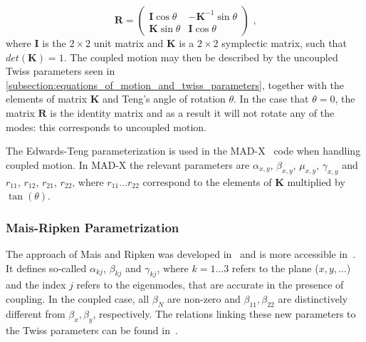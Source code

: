 \begin{equation}
    \mathbf{R} =\left(
        \begin{array}{cc}
            \mathbf{I} \cos \theta & -\mathbf{K}^{-1} \sin \theta \\
            \mathbf{K} \sin \theta & \mathbf{I} \cos \theta
    \end{array} \right) \text{ ,}
    \label{equation:edwards_teng_rotation_matrix}
\end{equation}
where \(\mathbf{I}\) is the \(2 \times 2\) unit matrix and \(\mathbf{K}\) is a \(2 \times 2\) symplectic matrix, such that \(det(\mathbf{K}) = 1\).
The coupled motion may then be described by the uncoupled Twiss parameters seen in \cref{subsection:equations_of_motion_and_twiss_parameters}, together with the elements of matrix \(\mathbf{K}\) and Teng's angle of rotation \(\theta\).
In the case that \(\theta = 0\), the matrix \(\mathbf{R}\) is the identity matrix and as a result it will not rotate any of the modes: this corresponds to uncoupled motion.

The Edwards-Teng parameterization is used in the MAD-X~\cite{CODE:MADX_guide} code when handling coupled motion.
In MAD-X the relevant parameters are \(\alpha_{x, y}\), \(\beta_{x, y}\), \(\mu_{x, y}\), \(\gamma_{x, y}\) and \(r_{11}\), \(r_{12}\), \(r_{21}\), \(r_{22}\), where \(r_{11} \ldots r_{22}\) correspond to the elements of \(\mathbf{K}\) multiplied by \(\tan(\theta)\).

\subsubsection*{Mais-Ripken Parametrization}

The approach of Mais and Ripken was developed in~\cite{REPORT:Ripken:AllGerman} and is more accessible in~\cite{AIP:Willeke:Methods_Beam_Optics, REPORT:Borchardt:Calculation_Beam_Envelopes}.
It defines so-called  \(\alpha_{kj}\), \(\beta_{kj}\) and \(\gamma_{kj}\), where \(k = 1 \ldots 3\) refers to the plane (\(x, y, \ldots\)) and the index \(j\) refers to the eigenmodes, that are accurate in the presence of coupling.
In the coupled case, all \(\beta_N\) are non-zero and \(\beta_{11}, \beta_{22}\) are distinctively different from \(\beta_x, \beta_y\), respectively.
The relations linking these new parameters to the Twiss parameters can be found in~\cite{IOP:Lebedev:Betatron_Motion_Coupling}.

